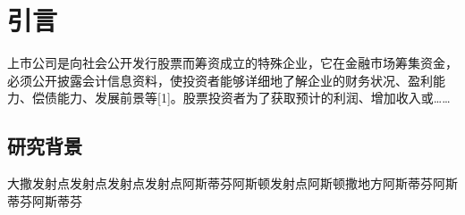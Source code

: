 \setcounter{page}{1}
\section{引言}
\setcounter{section}{1} \setcounter{subsection}{0}
上市公司是向社会公开发行股票而筹资成立的特殊企业，它在金融市场筹集资金，必须公开披露会计信息资料，使投资者能够详细地了解企业的财务状况、盈利能力、偿债能力、发展前景等[1]。股票投资者为了获取预计的利润、增加收入或……

\subsection{研究背景}

大撒发射点发射点发射点发射点阿斯蒂芬阿斯顿发射点阿斯顿撒地方阿斯蒂芬阿斯蒂芬阿斯蒂芬
